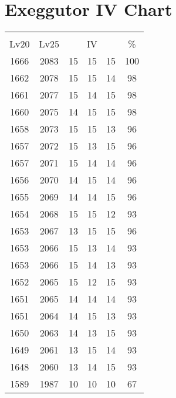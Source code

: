 \documentclass{article}%
\begin{document}
%
\normalsize%
\section{Exeggutor IV Chart}%
\label{sec:Exeggutor IV Chart}%
\renewcommand{\arraystretch}{1.5}%
\begin{tabular}{|c|c|c|c|c|c|}%
\hline%
\multicolumn{6}{|c|}{\textcolor{white}{ 
\linebreak{Exeggutor}
}%
\cellcolor{black}}\\%
\multicolumn{1}{|c}{Lv20}&\multicolumn{1}{c|}{Lv25}&\multicolumn{3}{c|}{IV}&\multicolumn{1}{|c|}{\%}\\%
\hline%
\rowcolor{color100}%
1666&2083&15&15&15&100\\%
\hline%
\rowcolor{color98}%
1662&2078&15&15&14&98\\%
\hline%
\rowcolor{color98}%
1661&2077&15&14&15&98\\%
\hline%
\rowcolor{color98}%
1660&2075&14&15&15&98\\%
\hline%
\rowcolor{color96}%
1658&2073&15&15&13&96\\%
\hline%
\rowcolor{color96}%
1657&2072&15&13&15&96\\%
\hline%
\rowcolor{color96}%
1657&2071&15&14&14&96\\%
\hline%
\rowcolor{color96}%
1656&2070&14&15&14&96\\%
\hline%
\rowcolor{color96}%
1655&2069&14&14&15&96\\%
\hline%
\rowcolor{color93}%
1654&2068&15&15&12&93\\%
\hline%
\rowcolor{color96}%
1653&2067&13&15&15&96\\%
\hline%
\rowcolor{color93}%
1653&2066&15&13&14&93\\%
\hline%
\rowcolor{color93}%
1653&2066&15&14&13&93\\%
\hline%
\rowcolor{color93}%
1652&2065&15&12&15&93\\%
\hline%
\rowcolor{color93}%
1651&2065&14&14&14&93\\%
\hline%
\rowcolor{color93}%
1651&2064&14&15&13&93\\%
\hline%
\rowcolor{color93}%
1650&2063&14&13&15&93\\%
\hline%
\rowcolor{color93}%
1649&2061&13&15&14&93\\%
\hline%
\rowcolor{color93}%
1648&2060&13&14&15&93\\%
\hline%
\rowcolor{color91}%
1589&1987&10&10&10&67\\%
\end{tabular}

%
\end{document}
